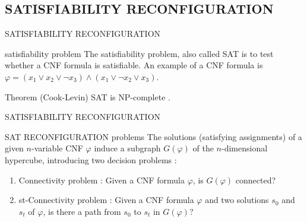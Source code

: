 \subsection{SATISFIABILITY RECONFIGURATION}

\begin{frame}{SATISFIABILITY RECONFIGURATION}
    \begin{block}{satisfiability problem}
      The satisfiability problem, also called SAT is to test whether a CNF formula is satisfiable. An example of a CNF formula is $\varphi = (x_1 \vee x_2 \vee \neg x_3) \wedge (x_1 \vee \neg x_2 \vee x_3)$.
    \end{block}

    \begin{block}{Theorem (Cook-Levin)}
      SAT is NP-complete \cite{10.1145/800157.805047}.
    \end{block}

\end{frame}

\begin{frame}{SATISFIABILITY RECONFIGURATION}
    \begin{block}{SAT RECONFIGURATION problems}
       The solutions (satisfying assignments) of a given $n$-variable CNF $\varphi$ induce a subgraph $G(\varphi)$ of the $n$-dimensional hypercube, introducing two decision problems : 
       
       \begin{enumerate}
           \item Connectivity problem : Given a CNF formula $\varphi$, is $G(\varphi)$ connected?
           \item st-Connectivity problem : Given a CNF formula $\varphi$ and two solutions $s_0$ and $s_t$ of $\varphi$, is there a path from $s_0$ to $s_t$ in $G(\varphi)$?
       \end{enumerate}
    \end{block}
\end{frame}

